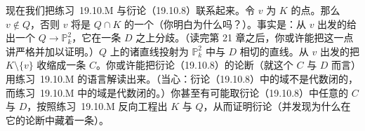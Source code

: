 现在我们把\mbox{练习~19.10.M} 与\trPoncelet{}衍论（\mbox{19.10.8}）联系起来。令 $v$ 为 $K$ 的\trCone{}点。那么 $v\notin Q$，否则 $v$ 将是 $Q\cap K$ 的一个\trSingularPoint（你明白为什么吗？）。事实是：从 $v$ 出发的\trProjection{}给出一个\trMorphism{} $Q\to\mathbb{P}^2_k$，它在一条\trSmooth{}\trConic{} $D$ 之上分歧。（读完第 21 章之后，你或许能把这一点讲严格并加以证明。）$Q$ 上的诸直线投射为 $\mathbb{P}^2_k$ 中与 $D$ 相切的直线。从 $v$ 出发的\trProjection{}把 $K\setminus\{v\}$ 收缩成一条\trConic{} $C$。你或许能把\trPoncelet{}衍论（\mbox{19.10.8}）的论断（就这个 $C$ 与 $D$ 而言）用\mbox{练习~19.10.M} 的语言解读出来。（当心：\trPoncelet{}衍论（\mbox{19.10.8}）中的域不是代数闭的，而\mbox{练习~19.10.M} 中的域是代数闭的。）你甚至有可能取\trPoncelet{}衍论（\mbox{19.10.8}）中任意的 $C$ 与 $D$，按照\mbox{练习~19.10.M} 反向工程出 $K$ 与 $Q$，从而证明\trPoncelet{}衍论（并发现为什么在它的论断中藏着一条\trEllipticCurve）。
